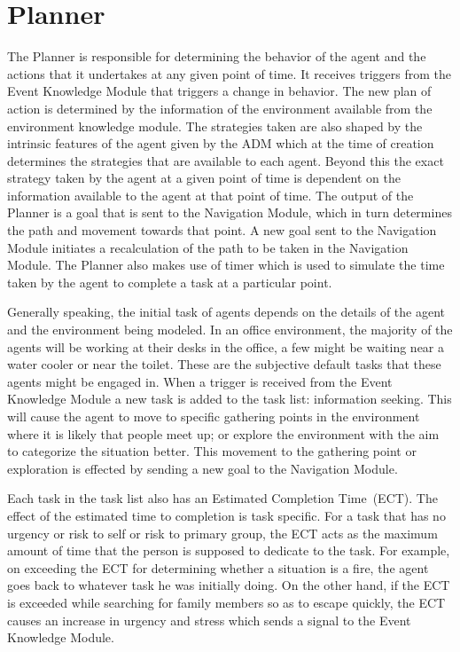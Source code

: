 \section{Planner}
\label{CFW:Planner}
The Planner is responsible for determining the behavior of the agent and the actions that it undertakes at any given point of time. It receives triggers from the Event Knowledge Module that triggers a change in behavior. The new plan of action is determined by the information of the environment available from the environment knowledge module. The strategies taken are also shaped by the intrinsic features of the agent given by the ADM which at the time of creation determines the strategies that are available to each agent. Beyond this the exact strategy taken by the agent at a given point of time is dependent on the information available to the agent at that point of time. The output of the Planner is a goal that is sent to the Navigation Module, which in turn determines the path and movement towards that point. A new goal sent to the Navigation Module initiates a recalculation of the path to be taken in the Navigation Module. The Planner also makes use of timer which is used to simulate the time taken by the agent to complete a task at a particular point.

Generally speaking, the initial task of agents depends on the details of the agent and the environment being modeled. In an office environment, the majority of the agents will be working at their desks in the office, a few might be waiting near a water cooler or near the toilet. These are the subjective default tasks that these agents might be engaged in. When a trigger is received from the Event Knowledge Module a new task is added to the task list: information seeking. This will cause the agent to move to specific gathering points in the environment where it is likely that people meet up; or explore the environment with the aim to categorize the situation better. This movement to the gathering point or exploration is effected by sending a new goal to the Navigation Module.

Each task in the task list also has an Estimated Completion Time~(ECT). The effect of the estimated time to completion is task specific. For a task that has no urgency or risk to self or risk to primary group, the ECT acts as the maximum amount of time that the person is supposed to dedicate to the task. For example, on exceeding the ECT for determining whether a situation is a fire, the agent goes back to whatever task he was initially doing. On the other hand, if the ECT is exceeded while searching for family members so as to escape quickly, the ECT causes an increase in urgency and stress which sends a signal to the Event Knowledge Module.

